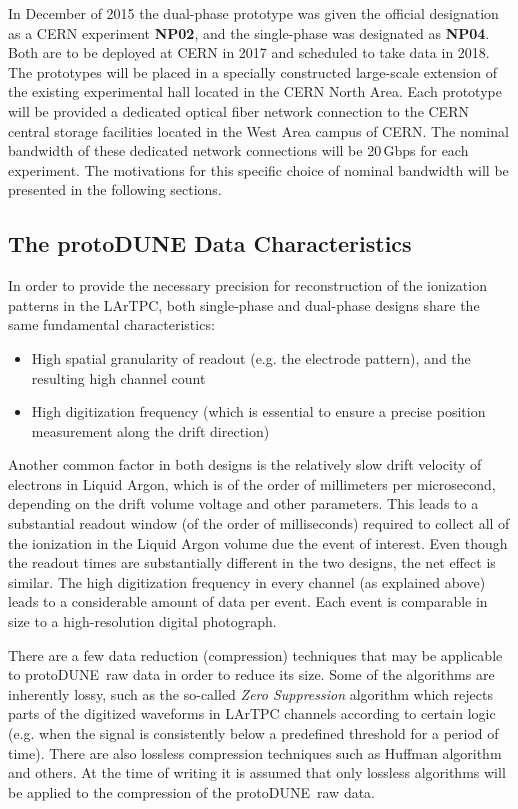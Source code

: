 \documentclass[pdftex,12pt,letter]{article}
\newcommand{\pd}{protoDUNE\ }
\begin{document}
In December of 2015 the dual-phase prototype was given the official designation as a CERN experiment \textbf{NP02}, and the single-phase was
designated as \textbf{NP04}. Both are to be deployed at CERN in 2017 and scheduled to take data in 2018. The prototypes will be placed in a specially
constructed large-scale extension of the existing experimental hall located in the CERN North Area. Each prototype will be provided a dedicated
optical fiber network connection to the CERN central storage facilities located in the West Area campus of CERN. The nominal bandwidth of these
dedicated network connections will be 20\,Gbps for each experiment. The motivations for this specific choice of nominal bandwidth will be
presented in the following sections.

\subsection{The protoDUNE Data Characteristics}

In order to provide the necessary precision for reconstruction of the ionization patterns in the LArTPC, both single-phase and dual-phase designs share the same fundamental characteristics:
\begin{itemize}
\item High spatial granularity of readout (e.g. the electrode pattern), and the resulting high channel count
\item High digitization frequency (which is essential to ensure a precise position measurement along the drift direction)
\end{itemize}

\noindent
Another common factor in both designs is the relatively slow drift velocity of electrons in Liquid Argon, which is of the order of millimeters per microsecond,
depending on the drift volume voltage and other parameters. This leads to a substantial readout window (of the order of milliseconds) required to collect
all of the ionization in the Liquid Argon volume due the event of interest. Even though the readout times are substantially different in the two designs,
the net effect is similar. The high digitization frequency in every channel (as explained above) leads to a considerable amount of data per event.
 Each event is comparable in size to a high-resolution digital photograph.

There are a few data reduction (compression) techniques that may be applicable to \pd raw data in order to reduce its size. Some of the algorithms
are inherently lossy, such as the so-called \textit{Zero Suppression} algorithm which rejects parts of the digitized waveforms in LArTPC channels according
to certain logic (e.g. when the signal is consistently below a predefined threshold for a period of time). There are also lossless compression
techniques such as Huffman algorithm and others. At the time of writing it is assumed that only lossless algorithms will be applied to the compression
of the \pd raw data.
\end{document}
